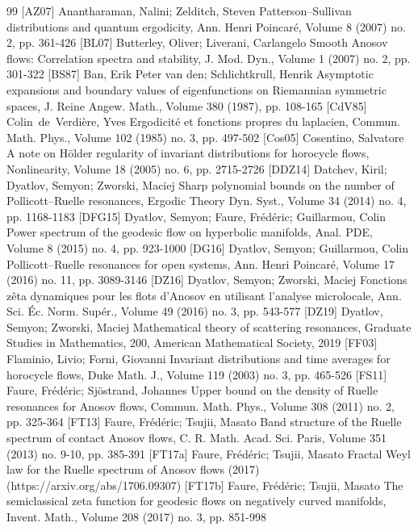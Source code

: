 \documentclass[10pt]{amsart}
\theoremstyle{definition}
\begin{document}
\begin{thebibliography}{99}
 [AZ07] Anantharaman, Nalini; Zelditch, Steven Patterson–Sullivan distributions and quantum ergodicity, Ann. Henri Poincaré, Volume 8 (2007) no. 2, pp. 361-426
 [BL07] Butterley, Oliver; Liverani, Carlangelo Smooth Anosov flows: Correlation spectra and stability, J. Mod. Dyn., Volume 1 (2007) no. 2, pp. 301-322
 [BS87] Ban, Erik Peter van den; Schlichtkrull, Henrik Asymptotic expansions and boundary values of eigenfunctions on Riemannian symmetric spaces, J. Reine Angew. Math., Volume 380 (1987), pp. 108-165
 [CdV85] Colin de Verdière, Yves Ergodicité et fonctions propres du laplacien, Commun. Math. Phys., Volume 102 (1985) no. 3, pp. 497-502
 [Cos05] Cosentino, Salvatore A note on Hölder regularity of invariant distributions for horocycle flows, Nonlinearity, Volume 18 (2005) no. 6, pp. 2715-2726
 [DDZ14] Datchev, Kiril; Dyatlov, Semyon; Zworski, Maciej Sharp polynomial bounds on the number of Pollicott–Ruelle resonances, Ergodic Theory Dyn. Syst., Volume 34 (2014) no. 4, pp. 1168-1183
 [DFG15] Dyatlov, Semyon; Faure, Frédéric; Guillarmou, Colin Power spectrum of the geodesic flow on hyperbolic manifolds, Anal. PDE, Volume 8 (2015) no. 4, pp. 923-1000
 [DG16] Dyatlov, Semyon; Guillarmou, Colin Pollicott–Ruelle resonances for open systems, Ann. Henri Poincaré, Volume 17 (2016) no. 11, pp. 3089-3146
 [DZ16] Dyatlov, Semyon; Zworski, Maciej Fonctions zêta dynamiques pour les flots d’Anosov en utilisant l’analyse microlocale, Ann. Sci. Éc. Norm. Supér., Volume 49 (2016) no. 3, pp. 543-577
 [DZ19] Dyatlov, Semyon; Zworski, Maciej Mathematical theory of scattering resonances, Graduate Studies in Mathematics, 200, American Mathematical Society, 2019
 [FF03] Flaminio, Livio; Forni, Giovanni Invariant distributions and time averages for horocycle flows, Duke Math. J., Volume 119 (2003) no. 3, pp. 465-526
 [FS11] Faure, Frédéric; Sjöstrand, Johannes Upper bound on the density of Ruelle resonances for Anosov flows, Commun. Math. Phys., Volume 308 (2011) no. 2, pp. 325-364
 [FT13] Faure, Frédéric; Tsujii, Masato Band structure of the Ruelle spectrum of contact Anosov flows, C. R. Math. Acad. Sci. Paris, Volume 351 (2013) no. 9-10, pp. 385-391
 [FT17a] Faure, Frédéric; Tsujii, Masato Fractal Weyl law for the Ruelle spectrum of Anosov flows (2017) (https://arxiv.org/abs/1706.09307)
 [FT17b] Faure, Frédéric; Tsujii, Masato The semiclassical zeta function for geodesic flows on negatively curved manifolds, Invent. Math., Volume 208 (2017) no. 3, pp. 851-998

\end{thebibliography}
\end{document}
